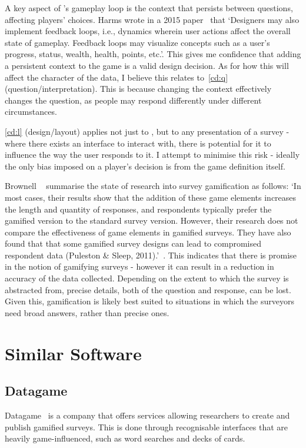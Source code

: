 A key aspect of \od{}'s gameplay loop is the context that persists between questions, affecting players' choices. Harms \etal{} wrote in a 2015 paper~\cite{Olympic} that `Designers may also implement feedback loops, i.e., dynamics wherein user actions affect the overall state of gameplay. Feedback loops may visualize concepts such as a user’s progress, status, wealth, health, points, etc.'. 
This gives me confidence that adding a persistent context to the game is a valid design decision.
As for how this will affect the character of the data, I believe this relates to~\ref{cd:q} (question/interpretation). 
This is because changing the context effectively changes the question, as people may respond differently under different circumstances. 

\ref{cd:l} (design/layout) applies not just to \od, but to any presentation of a survey - where there exists an interface to interact with, there is potential for it to influence the way the user responds to it. I attempt to minimise this risk - ideally the only bias imposed on a player's decision is from the game definition itself.

Brownell \etal{}~\cite{SurveyGamificationResearch} summarise the state of research into survey gamification as follows:
`In most cases, their results show that the addition of these game elements increases the length and quantity of responses, and respondents typically prefer the gamified version to the standard survey version. However, their research does not compare the effectiveness of game elements in gamified surveys. They have also found that that some gamified survey designs can lead to compromised respondent data (Puleston \& Sleep, 2011).'~\cite{SurveyGamificationResearch}.
This indicates that there is promise in the notion of gamifying surveys - however it can result in a reduction in accuracy of the data collected. Depending on the extent to which the survey is abstracted from, precise details, both of the question and response, can be lost. Given this, gamification is likely best suited to situations in which the surveyors need broad answers, rather than precise ones.

\section{Similar Software}\label{soft}

\subsection{Datagame}
Datagame~\cite{Datagame} is a company that offers services allowing researchers to create and publish gamified surveys. This is done through recognisable interfaces that are heavily game-influenced, such as word searches and decks of cards.

